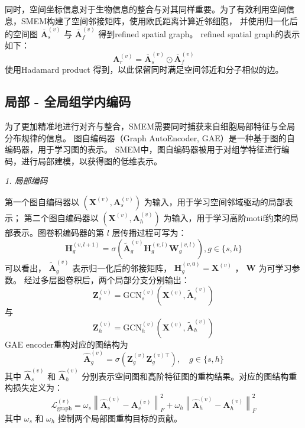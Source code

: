 \documentclass[journal]{IEEEtran}
\begin{document}
同时，空间坐标信息对于生物信息的整合与对其同样重要。为了有效利用空间信息，SMEM构建了空间邻接矩阵，使用欧氏距离计算近邻细胞，
并使用归一化后的空间图 $\overline{\mathbf{A}}_{s}^{(v)}$ 与 $\overline{\mathbf{A}}_{f}^{(v)}$ 得到refined spatial graph。
refined spatial graph的表示如下：
\begin{equation}
\mathbf{A}_{r}^{(v)}=\overline{\mathbf{A}}_{s}^{(v)}\odot\overline{\mathbf{A}}_{f}^{(v)}
\end{equation}
使用Hadamard product 得到，以此保留同时满足空间邻近和分子相似的边。

\subsection{局部 - 全局组学内编码}
为了更加精准地进行对齐与整合，SMEM需要同时捕获来自细胞局部特征与全局分布规律的信息。
图自编码器（Graph AutoEncoder, GAE）是一种基于图的自编码器，用于学习图的表示。
SMEM中，图自编码器被用于对组学特征进行编码，进行局部建模，以获得图的低维表示。

\textit{1. 局部编码}

第一个图自编码器以 $(\mathbf{X}^{(v)},\mathbf{A}_s^{(v)})$ 为输入，用于学习空间邻域驱动的局部表示；
第二个图自编码器以 $(\mathbf{X}^{(v)},\mathbf{A}_h^{(v)})$ 为输入，用于学习高阶motif约束的局部表示。图卷积编码器的第 $l$ 层传播过程可写为：
\begin{equation}
\mathbf{H}_{g}^{(v,l+1)}
=
\sigma\left(
\widetilde{\mathbf{A}}_{g}^{(v)}
\mathbf{H}_{g}^{(v,l)}
\mathbf{W}_{g}^{(v,l)}
\right),
g\in\{s,h\}
\end{equation}
可以看出， $\widetilde{\mathbf{A}}_{g}^{(v)}$ 表示归一化后的邻接矩阵，
$\mathbf{H}_{g}^{(v,0)}=\mathbf{X}^{(v)}$ ， $\mathbf{W}$ 为可学习参数。
经过多层图卷积后，两个局部分支分别输出：
\begin{equation}
\mathbf{Z}_{s}^{(v)}
=
\mathrm{GCN}_{s}^{(v)}
\left(
\mathbf{X}^{(v)},\widetilde{\mathbf{A}}_{s}^{(v)}
\right)
\end{equation}
与
\begin{equation}
\mathbf{Z}_{h}^{(v)}
=
\mathrm{GCN}_{h}^{(v)}
\left(
\mathbf{X}^{(v)},\widetilde{\mathbf{A}}_{h}^{(v)}
\right)
\end{equation}
GAE encoder重构对应的图结构为
\begin{equation}
\widehat{\mathbf{A}}_{g}^{(v)}
=
\sigma\left(
\mathbf{Z}_{g}^{(v)}
\mathbf{Z}_{g}^{(v)\top}
\right),
\quad
g\in\{s,h\}
\end{equation}
其中 $\widehat{\mathbf{A}}_{s}^{(v)}$ 和 $\widehat{\mathbf{A}}_{h}^{(v)}$ 分别表示空间图和高阶特征图的重构结果。对应的图结构重构损失定义为：
\begin{equation}
\mathcal{L}_{\mathrm{graph}}^{(v)}
=
\omega_s
\left\|
\widehat{\mathbf{A}}_{s}^{(v)}
-
\mathbf{A}_{s}^{(v)}
\right\|_F^2
+
\omega_h
\left\|
\widehat{\mathbf{A}}_{h}^{(v)}
-
\mathbf{A}_{h}^{(v)}
\right\|_F^2
\end{equation}
其中 $\omega_s$ 和 $\omega_h$ 控制两个局部图重构目标的贡献。
\end{document}
